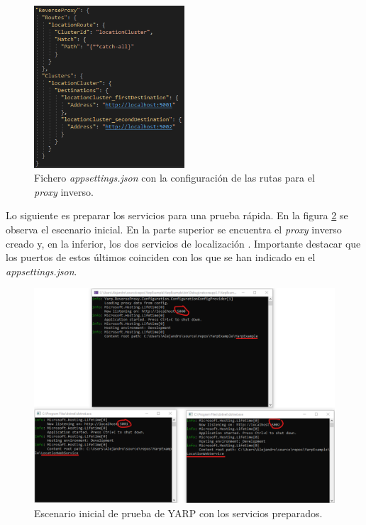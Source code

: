 \documentclass[11pt,spanish,listoffigures]{tfgetsinf}
\begin{document}
\begin{figure}[ht]
\centering
\includegraphics[width=0.5\textwidth]{imagenes/ejemploYARP/appsettings}
\caption{Fichero \emph{appsettings.json} con la configuración de las rutas para el \emph{proxy} inverso.}
	\label{ejemploYARP_appsettings}
\end{figure}

Lo siguiente es preparar los servicios para una prueba rápida. En la figura \ref{ejemploYARP_servicios_preparacion} se observa el escenario inicial. En la parte superior se encuentra el \emph{proxy} inverso creado y, en la inferior, los dos servicios de localización . Importante destacar que los puertos de estos últimos coinciden con los que se han indicado en el \emph{appsettings.json}.

\begin{figure}[ht]
\centering
\includegraphics[width=1\textwidth]{imagenes/ejemploYARP/servicios_preparacion}
\caption{Escenario inicial de prueba de YARP con los servicios preparados.}
	\label{ejemploYARP_servicios_preparacion}
\end{figure}
\end{document}
